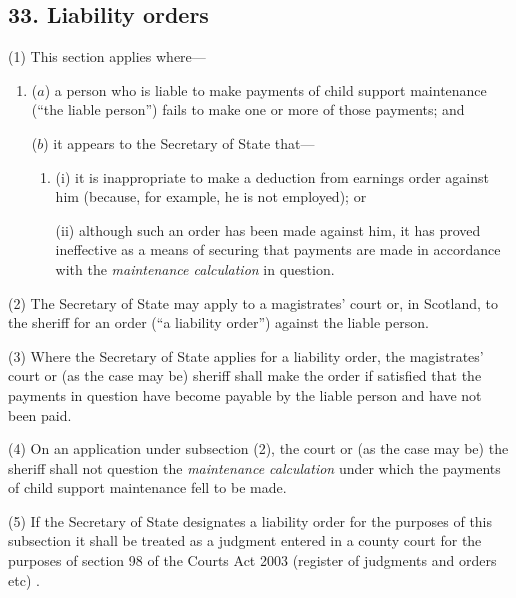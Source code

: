 \documentclass[12pt,a4paper]{article}
\begin{document}
\subsection{33. Liability orders}

(1) This section applies where—
\begin{enumerate}\item[]
($a$) a person who is liable to make payments of child support maintenance (“the liable person”) fails to make one or more of those payments; and

($b$) it appears to the 
Secretary of State  %
that—
\begin{enumerate}\item[]
(i) it is inappropriate to make a deduction from earnings order against him (because, for example, he is not employed); or

(ii) although such an order has been made against him, it has proved ineffective as a means of securing that payments are made in accordance with the 
\emph{maintenance calculation}  %
in question.
\end{enumerate}
\end{enumerate}

(2) The 
Secretary of State  %
may apply to a magistrates' court or, in Scotland, to the sheriff for an order (“a liability order”) against the liable person.

(3) Where the 
Secretary of State  %
applies for a liability order, the magistrates' court or (as the case may be) sheriff shall make the order if satisfied that the payments in question have become payable by the liable person and have not been paid.

(4) On an application under subsection (2), the court or (as the case may be) the sheriff shall not question the 
\emph{maintenance calculation}  %
under which the payments of child support maintenance fell to be made.

(5) If the 
Secretary of State  %
designates a liability order for the purposes of this subsection it shall be treated as a judgment entered in a county court for the purposes of %
section 98 of the Courts Act 2003 (register of judgments and orders etc)%
.
\end{document}
